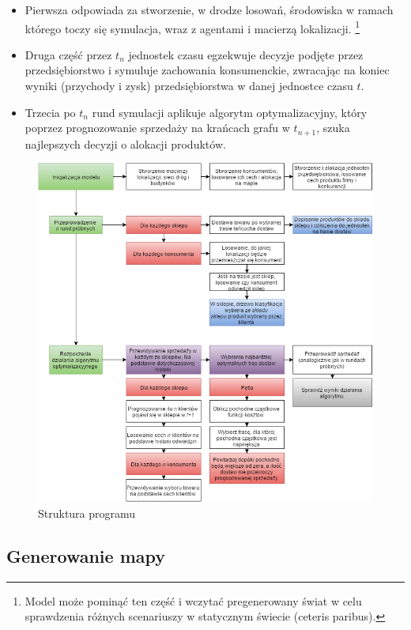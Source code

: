 \documentclass{article}
\begin{document}
	\begin{itemize}
		\item Pierwsza odpowiada za stworzenie, w drodze losowań, środowiska w ramach którego toczy się symulacja, wraz z agentami i macierzą lokalizacji. \footnote{Model może pominąć ten część i wczytać pregenerowany świat w celu sprawdzenia różnych scenariuszy w statycznym świecie (ceteris paribus).}
		\item  Druga część przez $t_n$ jednostek czasu egzekwuje decyzje podjęte przez przedsiębiorstwo i symuluje zachowania konsumenckie, zwracając na koniec wyniki (przychody i zysk) przedsiębiorstwa w danej jednostce czasu $t$.
		\item Trzecia po $t_n$ rund symulacji aplikuje algorytm optymalizacyjny, który poprzez prognozowanie sprzedaży na krańcach grafu w $t_{n+1}$, szuka najlepszych decyzji o alokacji produktów.
	\end{itemize}

\begin{figure}
  \centering
\includegraphics[width=\linewidth]{pictures/Struktura.png}
  \caption{Struktura programu}
  \label{fig:struktura}
\end{figure}


\subsection{Generowanie mapy}
\end{document}
